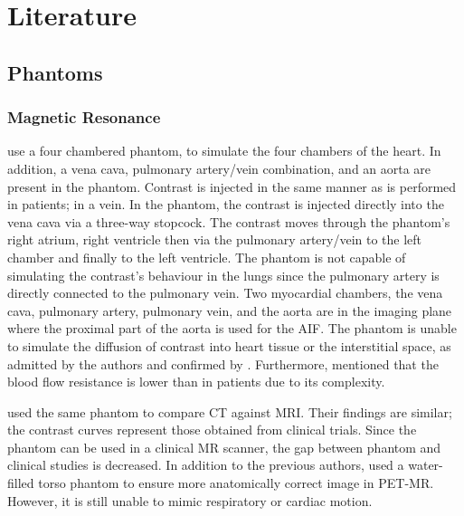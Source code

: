 \chapter{Literature}
\label{ch:literature}

\section{Phantoms}
\subsection{Magnetic Resonance}
\cite{chiribiri2013perfusion} use a four chambered phantom, to simulate the four chambers of the heart. In addition, a vena cava, pulmonary artery/vein combination, and an aorta are present in the phantom. Contrast is injected in the same manner as is performed in patients; in a vein. In the phantom, the contrast is injected directly into the vena cava via a three-way stopcock. The contrast moves through the phantom's right atrium, right ventricle then via the pulmonary artery/vein to the left chamber and finally to the left ventricle. The phantom is not capable of simulating the contrast's behaviour in the lungs since the pulmonary artery is directly connected to the pulmonary vein. Two myocardial chambers, the vena cava, pulmonary artery, pulmonary vein, and the aorta are in the imaging plane where the proximal part of the aorta is used for the AIF. The phantom is unable to simulate the diffusion of contrast into heart tissue or the interstitial space, as admitted by the authors and confirmed by \cite{otton2013direct, o2017effect}. Furthermore, \cite{chiribiri2013perfusion} mentioned that the blood flow resistance is lower than in patients due to its complexity. 

\cite{otton2013direct} used the same phantom to compare CT against MRI. Their findings are similar; the contrast curves represent those obtained from clinical trials. Since the phantom can be used in a clinical MR scanner, the gap between phantom and clinical studies is decreased. In addition to the previous authors, \cite{o2017effect} used a water-filled torso phantom to ensure more anatomically correct image in PET-MR. However, it is still unable to mimic respiratory or cardiac motion.
